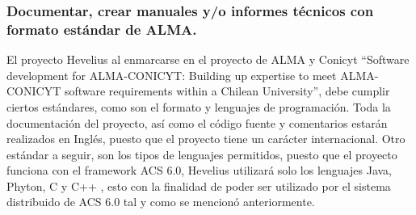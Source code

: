 \documentclass[letterpaper,spanish,10pt]{article}
\begin{document}
\subsubsection{Documentar, crear manuales y/o informes t\'ecnicos con formato est\'andar de ALMA.}
El proyecto Hevelius al enmarcarse en el proyecto de ALMA y Conicyt ``Software development for ALMA-CONICYT: Building up expertise to meet ALMA-CONICYT software requirements within a Chilean University'', debe cumplir ciertos estándares, como son el formato y lenguajes de programación. 
Toda la documentación del proyecto, así como el código fuente y comentarios estarán realizados en Inglés, puesto que el proyecto tiene un carácter internacional.
Otro estándar a seguir, son los tipos de lenguajes permitidos, puesto que el proyecto funciona con el framework ACS 6.0, Hevelius utilizará solo los lenguajes Java, Phyton, C y C++ , esto con la finalidad de poder ser utilizado por el sistema distribuido de ACS 6.0 tal y como se mencionó anteriormente.
\end{document}
